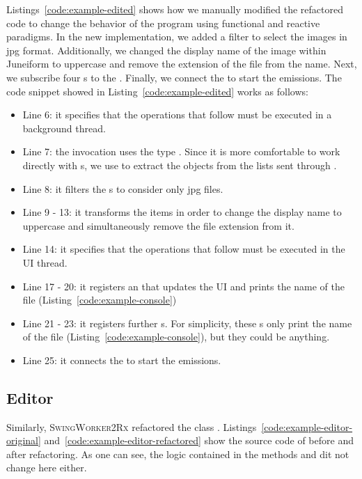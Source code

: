 \documentclass[type=bsc,accentcolor=tud9c]{tudthesis}
\newcommand{\toolextension}{\textsc{SwingWorker2Rx}}
\begin{document}
Listings~\ref{code:example-edited} shows how we manually modified the refactored code to change the behavior of the program using functional and reactive paradigms. In the new implementation, we added a filter to select the images in jpg format. Additionally, we changed the display name of the image within Juneiform to uppercase and remove the extension of the file from the name. Next, we subscribe four s to the . Finally, we connect the  to start the emissions. The code snippet showed in Listing~\ref{code:example-edited} works as follows:
\begin{itemize}
	\item Line 6: it specifies that the operations that follow must be executed in a background thread.
	\item Line 7: the  invocation uses the type . Since it is more comfortable to work directly with s, we use  to extract the  objects from the lists sent through .
	\item Line 8: it filters the s to consider only jpg files.
	\item Line 9 - 13: it transforms the items in order to change the display name to uppercase and simultaneously remove the file extension from it.
	\item Line 14: it specifies that the operations that follow must be executed in the UI thread.
	\item Line 17 - 20: it registers an  that updates the UI and prints the name of the file (Listing~\ref{code:example-console})
	\item Line 21 - 23: it registers further s. For simplicity, these s only print the name of the file  (Listing~\ref{code:example-console}), but they could be anything.
	\item Line 25: it connects the  to start the emissions.
\end{itemize}





\subsection{Editor}

Similarly, \toolextension{} refactored the class . Listings~\ref{code:example-editor-original} and~\ref{code:example-editor-refactored} show the source code of  before and after refactoring. As one can see, the logic contained in the methods  and  dit not change here either.
\end{document}
